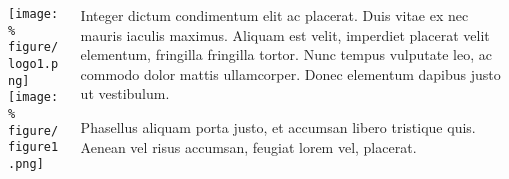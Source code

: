 \documentclass[unknownkeysallowed,usepdftitle=false, aspectratio=169, parskip=full]{beamer}
\newcommand{\secvariable}{nothing}
\begin{document}
\begin{frame}\label{\secvariable}
  \begin{columns}[t]
  \begin{column}[c]{0.45\textwidth}
\texttt{[image: \%
figure/logo1.png]}\\
\vspace{12pt}
\texttt{[image: \%
figure/figure1.png]}
    \end{column}
    \begin{column}[c]{0.45\textwidth}
    \parbox{\linewidth}{

      Integer dictum condimentum elit ac placerat. Duis vitae ex nec mauris iaculis maximus. Aliquam est velit, imperdiet placerat velit elementum, fringilla fringilla tortor. Nunc tempus vulputate leo, ac commodo dolor mattis ullamcorper. Donec elementum dapibus justo ut vestibulum. 
      
      \vspace{12pt}
      
      Phasellus aliquam porta justo, et accumsan libero tristique quis. Aenean vel risus accumsan, feugiat lorem vel, placerat.
      }
    \end{column}
    
  \end{columns}

  
\end{frame}
\end{document}
